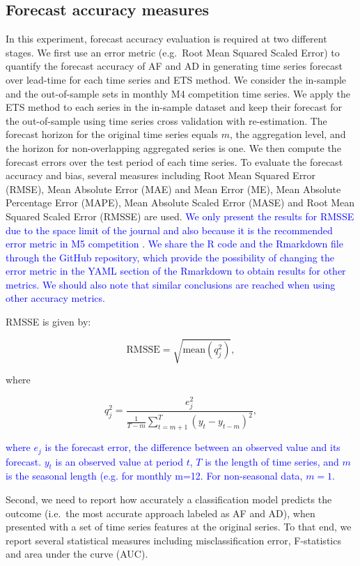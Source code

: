 \documentclass[preprint, 3p,
authoryear]{elsarticle} %
\begin{document}
\hypertarget{errormetric}{%
\subsection{Forecast accuracy measures}\label{errormetric}}

In this experiment, forecast accuracy evaluation is required at two
different stages. We first use an error metric (e.g.~Root Mean Squared
Scaled Error) to quantify the forecast accuracy of AF and AD in
generating time series forecast over lead-time for each time series and
ETS method. We consider the in-sample and the out-of-sample sets in
monthly M4 competition time series. We apply the ETS method to each
series in the in-sample dataset and keep their forecast for the
out-of-sample using time series cross validation with re-estimation. The
forecast horizon for the original time series equals \(m\), the
aggregation level, and the horizon for non-overlapping aggregated series
is one. We then compute the forecast errors over the test period of each
time series. To evaluate the forecast accuracy and bias, several
measures including Root Mean Squared Error (RMSE), Mean Absolute Error
(MAE) and Mean Error (ME), Mean Absolute Percentage Error (MAPE), Mean
Absolute Scaled Error (MASE) and Root Mean Squared Scaled Error (RMSSE)
are used.
\textcolor{blue}{We only present the results for RMSSE due to the space limit of the journal and also because it is the recommended error metric in M5 competition}
\citep{M5competition2022}.
\textcolor{blue}{We share the R code and the Rmarkdown file through the GitHub repository, which provide the possibility of changing the error metric in the YAML section of the Rmarkdown to obtain results for other metrics. We should also note that similar conclusions are reached when using other accuracy metrics.}

RMSSE is given by:

\[ \text{RMSSE} = \sqrt{\text{mean}(q_{j}^2)},\]

where

\[q^2_{j} = \frac{\displaystyle e^2_{j}}
    {\displaystyle\frac{1}{T-m}\sum_{t=m+1}^T (y_{t}-y_{t-m})^2},\]

\textcolor{blue}{where $e_{j}$ is the forecast error, the difference between an observed value and its forecast. $y_{t}$ is an observed value at period $t$, $T$ is the length of time series, and $m$ is the seasonal length (e.g. for monthly m=12. For non-seasonal data, $m=1$.}

Second, we need to report how accurately a classification model predicts
the outcome (i.e.~the most accurate approach labeled as AF and AD), when
presented with a set of time series features at the original series. To
that end, we report several statistical measures including
misclassification error, F-statistics and area under the curve (AUC).
\end{document}
